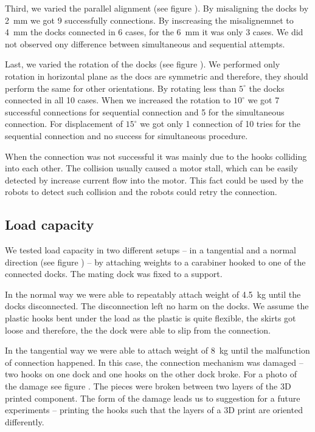 Third, we varied the parallel alignment (see figure \todo{}). By misaligning the
docks by 2~mm we got 9 successfully connections. By inscreasing the
misalignemnet to 4~mm the docks connected in 6 cases, for the 6~mm it was only 3
cases. We did not observed ony difference between simultaneous and sequential
attempts.

Last, we varied the rotation of the docks (see figure \todo{}). We performed
only rotation in horizontal plane as the docs are symmetric and therefore, they
should perform the same for other orientations. By rotating less than $5^\circ$
the docks connected in all 10 cases. When we increased the rotation to
$10^\circ$ we got 7 successful connections for sequential connection and 5 for
the simultaneous connection. For displacement of $15^\circ$ we got only 1
connection of 10 tries for the sequential connection and no success for
simultaneous procedure.

When the connection was not successful it was mainly due to the hooks colliding
into each other. The collision usually caused a motor stall, which can be easily
detected by increase current flow into the motor. This fact could be used by the
robots to detect such collision and the robots could retry the connection.

\subsection{Load capacity}

We tested load capacity in two different setups -- in a tangential and a normal
direction (see figure \todo{}) -- by attaching weights to a carabiner hooked to
one of the connected docks. The mating dock was fixed to a support.

In the normal way we were able to repeatably attach weight of 4.5~kg until the
docks disconnected. The disconnection left no harm on the docks. We assume the
plastic hooks bent under the load as the plastic is quite flexible, the skirts
got loose and therefore, the the dock were able to slip from the connection.

In the tangential way we were able to attach weight of 8~kg until the
malfunction of connection happened. In this case, the connection mechanism was
damaged -- two hooks on one dock and one hooks on the other dock broke. For a
photo of the damage see figure \todo{}. The pieces were broken between two
layers of the 3D printed component. The form of the damage leads us to
suggestion for a future experiments -- printing the hooks such that the layers
of a 3D print are oriented differently.


